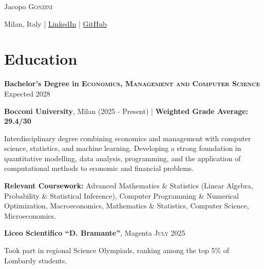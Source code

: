 \documentclass[a4paper,11pt]{extarticle}
\newcommand{\cvdetail}{\fontsize{11pt}{14pt}\selectfont}
\newcommand{\cvdate}[1]{%
    {\fontsize{9pt}{10.5pt}\selectfont\textsc{#1}}%
}
\newcommand{\entrygap}{\vspace{3pt}}
\begin{document}

\begin{center}
    {\fontsize{22pt}{24pt}\selectfont
        Jacopo \textsc{Gonzini}
    }

    \vspace{2pt}

    \small
    Milan, Italy
    \quad | \quad
    \href{https://www.linkedin.com/in/jacopo-gonzini-7946b5240}{LinkedIn}
    \quad | \quad
    \href{https://github.com/0jach}{GitHub}
\end{center}

\vspace{-2pt}


\section{Education}

\textbf{Bachelor's Degree in \textsc{Economics, Management and Computer Science}}
\hfill Expected 2028

\textbf{Bocconi University}, Milan (2025 - Present)
\quad | \quad
\textbf{Weighted Grade Average: 29.4/30}

{\cvdetail
Interdisciplinary degree combining economics and management with computer science,
statistics, and machine learning. Developing a strong foundation in quantitative
modelling, data analysis, programming, and the application of computational methods
to economic and financial problems.
\par}

\vspace{1pt}

{\cvdetail
\textbf{Relevant Coursework:}
Advanced Mathematics \& Statistics
(Linear Algebra, Probability \& Statistical Inference),
Computer Programming \& Numerical Optimization,
Macroeconomics,
Mathematics \& Statistics,
Computer Science,
Microeconomics.
\par}

\entrygap

\textbf{Liceo Scientifico ``D. Bramante''}, Magenta
\hfill
\cvdate{July 2025}

{\cvdetail
Took part in regional Science Olympiads, ranking among the top 5\% of Lombardy students.
\par}
\end{document}
